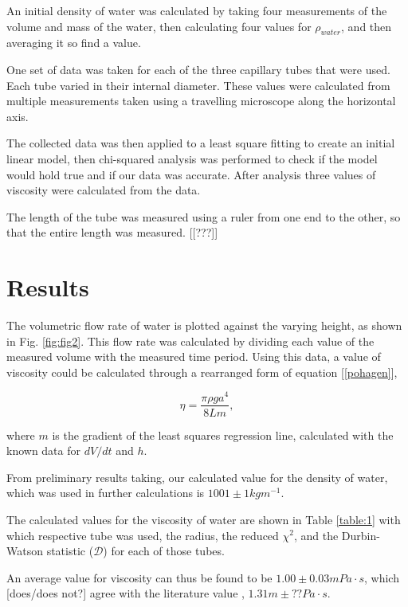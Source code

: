\documentclass[twocolumn]{revtex4}
\begin{document}
An initial density of water was calculated by taking four measurements of the volume and mass of the water, then calculating four values for $\rho_{water}$, and then averaging it so find a value. 

One set of data was taken for each of the three capillary tubes that were used. Each tube varied in their internal diameter. These values were calculated from multiple measurements taken using a travelling microscope along the horizontal axis.

The collected data was then applied to a least square fitting to create an initial linear model, then chi-squared analysis was performed to check if the model would hold true and if our data was accurate. After analysis three values of viscosity were calculated from the data. 

The length of the tube was measured using a ruler from one end to the other, so that the entire length was measured. [[???]]

\vspace{-3ex}
\section{Results}
\vspace{-2ex}

The volumetric flow rate of water is plotted against the varying height, as shown in Fig. \ref{fig:fig2}. This flow rate was calculated by dividing each value of the measured volume with the measured time period. Using this data, a value of viscosity could be calculated through a rearranged form of equation [\ref{pohagen}],

\begin{equation} 
\eta=\frac{\pi \rho g a^4 }{8 L m}, 
\label{r-pohagen}
\end{equation}

where $m$ is the gradient of the least squares regression line, calculated with the known data for $dV/dt$ and $h$.

From preliminary results taking, our calculated value for the density of water, which was used in further calculations is $1001 \pm 1 kg m^{-1}$.

The calculated values for the viscosity of water are shown in Table \ref{table:1} with which respective tube was used, the radius, the reduced $\chi^2$, and the Durbin-Watson statistic ($\mathcal{D}$) for each of those tubes. 

An average value for viscosity can thus be found to be $1.00 \pm 0.03 mPa\cdot{s}$, which [does/does not?] agree with the literature value \cite{crc}, $1.31m \pm ?? Pa\cdot{s}$. 
\end{document}
